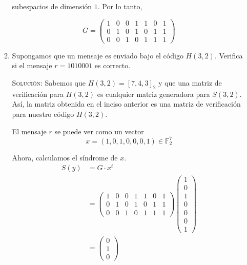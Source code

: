 \documentclass[letterpaper,10pt]{article}
\begin{document}
\begin{enumerate}
\begin{enumerate}
        subespacios de dimensión $1$. Por lo tanto, 

        \begin{equation*}
        G = 
        \begin{pmatrix}
        1 & 0 & 0 & 1 & 1 & 0 & 1\\
        0 & 1 & 0 & 1 & 0 & 1 & 1\\
        0 & 0 & 1 & 0 & 1 & 1 & 1
        \end{pmatrix}
        \end{equation*}
        
        \item Supongamos que un mensaje es enviado bajo el código $H(3,2)$.
        Verifica si el mensaje $r = 1010001$ es correcto. 
        
        \textsc{Solución:} Sabemos que $H(3,2) = [7, 4, 3]_{2}$ y que una
        matriz de verificación para $H(3,2)$ es cualquier matriz generadora
        para $S(3,2)$. Así, la matriz obtenida en el inciso anterior es una
        matriz de verificación para nuestro código $H(3,2)$.
        
        El mensaje $r$ se puede ver como un vector 
        \begin{equation*}
            x = (1, 0, 1, 0, 0, 0, 1) \in \mathbb{F}^{7}_{2}
        \end{equation*}

        Ahora, calculamos el síndrome de $x$.
        \begin{align*}
            S(y) 
            &= G \cdot x^{t} \\
            &= \begin{pmatrix}
               1 & 0 & 0 & 1 & 1 & 0 & 1\\
               0 & 1 & 0 & 1 & 0 & 1 & 1\\
               0 & 0 & 1 & 0 & 1 & 1 & 1
               \end{pmatrix}
               \begin{pmatrix}
               1 \\
               0 \\
               1 \\
               0 \\ 
               0 \\
               0 \\
               1
               \end{pmatrix} \\
            &= \begin{pmatrix}
               0 \\
               1 \\
               0 
               \end{pmatrix} \\
        \end{align*}
        

\end{enumerate}
\end{enumerate}
\end{document}
